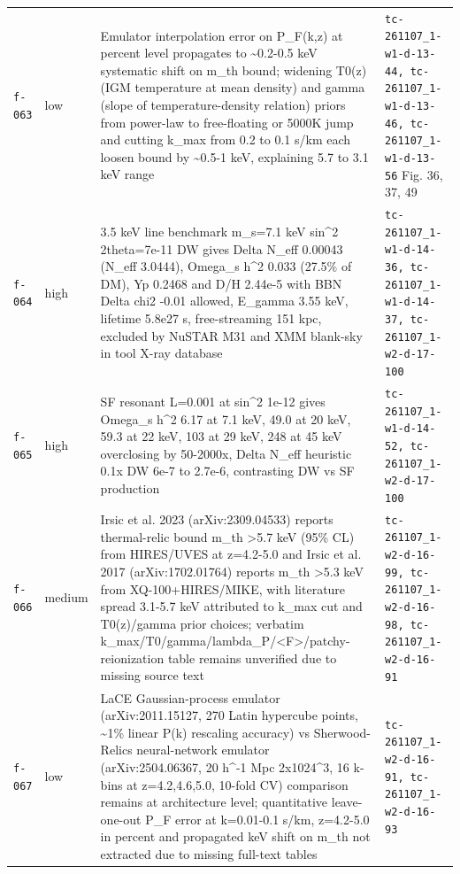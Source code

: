 \documentclass[11pt,a4paper]{article}
\begin{document}
\begin{longtable}{@{}p{}p{}p{}p{}@{}}
\texttt{f-063} & low & Emulator interpolation error on P\_F(k,z) at percent level propagates to \textasciitilde{}0.2-0.5 keV systematic shift on m\_th bound; widening T0(z) (IGM temperature at mean density) and gamma (slope of temperature-density relation) priors from power-law to free-floating or 5000K jump and cutting k\_max from 0.2 to 0.1 s/km each loosen bound by \textasciitilde{}0.5-1 keV, explaining 5.7 to 3.1 keV range & \texttt{tc-261107\_\allowbreak{}1-w1-d-13-44,\allowbreak{} tc-261107\_\allowbreak{}1-w1-d-13-46,\allowbreak{} tc-261107\_\allowbreak{}1-w1-d-13-56} Fig. 36, 37, 49 \\
\texttt{f-064} & high & 3.5 keV line benchmark m\_s=7.1 keV sin\textasciicircum{}2 2theta=7e-11 DW gives Delta N\_eff 0.00043 (N\_eff 3.0444), Omega\_s h\textasciicircum{}2 0.033 (27.5\% of DM), Yp 0.2468 and D/H 2.44e-5 with BBN Delta chi2 -0.01 allowed, E\_gamma 3.55 keV, lifetime 5.8e27 s, free-streaming 151 kpc, excluded by NuSTAR M31 and XMM blank-sky in tool X-ray database & \texttt{tc-261107\_\allowbreak{}1-w1-d-14-36,\allowbreak{} tc-261107\_\allowbreak{}1-w1-d-14-37,\allowbreak{} tc-261107\_\allowbreak{}1-w2-d-17-100} \\
\texttt{f-065} & high & SF resonant L=0.001 at sin\textasciicircum{}2 1e-12 gives Omega\_s h\textasciicircum{}2 6.17 at 7.1 keV, 49.0 at 20 keV, 59.3 at 22 keV, 103 at 29 keV, 248 at 45 keV overclosing by 50-2000x, Delta N\_eff heuristic 0.1x DW 6e-7 to 2.7e-6, contrasting DW vs SF production & \texttt{tc-261107\_\allowbreak{}1-w1-d-14-52,\allowbreak{} tc-261107\_\allowbreak{}1-w2-d-17-100} \\
\texttt{f-066} & medium & Irsic et al. 2023 (arXiv:2309.04533) reports thermal-relic bound m\_th \textgreater{}5.7 keV (95\% CL) from HIRES/UVES at z=4.2-5.0 and Irsic et al. 2017 (arXiv:1702.01764) reports m\_th \textgreater{}5.3 keV from XQ-100+HIRES/MIKE, with literature spread 3.1-5.7 keV attributed to k\_max cut and T0(z)/gamma prior choices; verbatim k\_max/T0/gamma/lambda\_P/\textless{}F\textgreater{}/patchy-reionization table remains unverified due to missing source text & \texttt{tc-261107\_\allowbreak{}1-w2-d-16-99,\allowbreak{} tc-261107\_\allowbreak{}1-w2-d-16-98,\allowbreak{} tc-261107\_\allowbreak{}1-w2-d-16-91} \\
\texttt{f-067} & low & LaCE Gaussian-process emulator (arXiv:2011.15127, 270 Latin hypercube points, \textasciitilde{}1\% linear P(k) rescaling accuracy) vs Sherwood-Relics neural-network emulator (arXiv:2504.06367, 20 h\textasciicircum{}-1 Mpc 2x1024\textasciicircum{}3, 16 k-bins at z=4.2,4.6,5.0, 10-fold CV) comparison remains at architecture level; quantitative leave-one-out P\_F error at k=0.01-0.1 s/km, z=4.2-5.0 in percent and propagated keV shift on m\_th not extracted due to missing full-text tables & \texttt{tc-261107\_\allowbreak{}1-w2-d-16-91,\allowbreak{} tc-261107\_\allowbreak{}1-w2-d-16-93} \\

\end{longtable}
\end{document}
